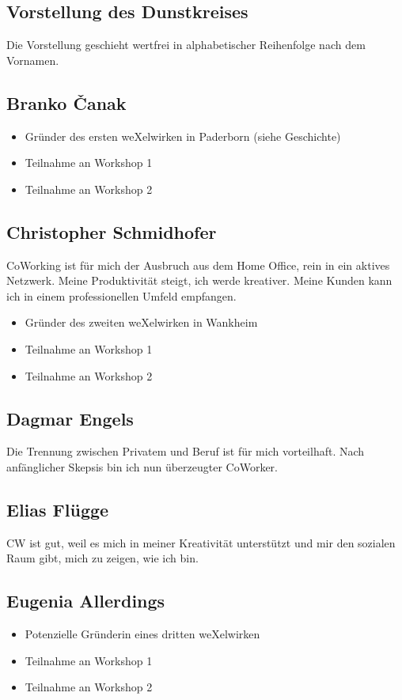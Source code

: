 \begin{appendix}
\chapter{Vorstellung des Dunstkreises}
Die Vorstellung geschieht wertfrei in alphabetischer Reihenfolge nach dem Vornamen.
  \section{Branko Čanak}
\begin{itemize}
\item {Gründer des ersten weXelwirken in Paderborn (siehe Geschichte)}
\item {Teilnahme an Workshop 1}
\item {Teilnahme an Workshop 2}
\end{itemize}
  \section{Christopher Schmidhofer}
\glqq CoWorking ist für mich der Ausbruch aus dem Home Office, rein in ein aktives Netzwerk. Meine Produktivität steigt, ich werde kreativer. Meine Kunden kann ich in einem professionellen Umfeld empfangen. \grqq
\begin{itemize}
\item {Gründer des zweiten weXelwirken in Wankheim}
\item {Teilnahme an Workshop 1}
\item {Teilnahme an Workshop 2}
\end{itemize}

  \section{Dagmar Engels}
\glqq Die Trennung zwischen Privatem und Beruf ist für mich vorteilhaft. Nach anfänglicher Skepsis bin ich nun überzeugter CoWorker. \grqq
  \section{Elias Flügge}
\glqq CW ist gut, weil es mich in meiner Kreativität unterstützt und mir den sozialen Raum gibt, mich zu zeigen, wie ich bin. \grqq
  \section{Eugenia Allerdings}
\begin{itemize}
\item {Potenzielle Gründerin eines dritten weXelwirken}
\item {Teilnahme an Workshop 1}
\item {Teilnahme an Workshop 2}
\end{itemize}

\end{appendix}
